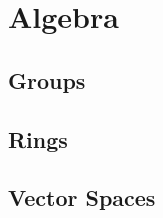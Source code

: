 \documentclass{book}
\begin{document}
	
	
	
	
	
	
	
	
	
	
	
	
	
	
	
	
	
	
	
	
	
	
	
	
	
	
	
	
	
	
	
	
	
	
	
	
	
	
	
	
	
	
	
	
	
	
	
	
	
	
	
	
	
	
	
	
	
	
	
	
	
	
	
	
	
	
	
	
	
	\part{Algebra}
	
	\chapter{Groups}
	
	\chapter{Rings}
	
	\chapter{Vector Spaces}
	
	
	
	
	
	
	
	
	
	
	
\end{document}

